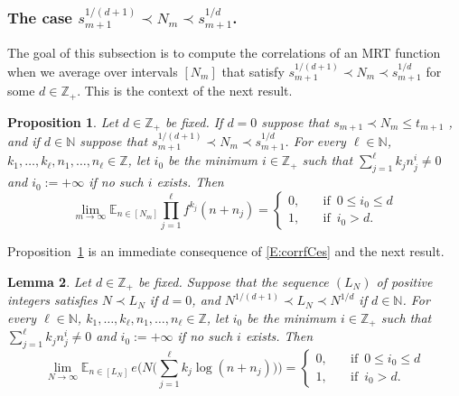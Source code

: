 \documentclass[11pt]{amsart}
\newtheorem{lemma}{Lemma}[section]
\newtheorem{proposition}[lemma]{Proposition}
\theoremstyle{definition}
\newcommand{\E}{{\mathbb E}}
\newcommand{\N}{{\mathbb N}}
\newcommand{\Z}{{\mathbb Z}}
\begin{document}
 	
 	
 		\subsubsection{The case  $s_{m+1}^{1/(d+1)}\prec N_m\prec s_{m+1}^{1/d}$.}
 		The goal of this subsection is to compute the correlations of an MRT function when
we average over intervals     $[N_m]$ that satisfy $s_{m+1}^{1/(d+1)}\prec N_m\prec s_{m+1}^{1/d}$ for some $d\in \Z_+$. This is the context of the next result.
	\begin{proposition}\label{P:corrlog2}
	Let  $d\in \Z_+$ be fixed. If $d=0$ suppose that
	$s_{m+1}\prec N_m\leq t_{m+1}$ ,  and  if $d\in \N$ suppose that $s_{m+1}^{1/(d+1)}\prec N_m\prec s_{m+1}^{1/d}$.
	For every $\ell\in\N$, $k_1,\ldots, k_\ell, n_1,\ldots, n_\ell \in \Z$,
	let  $i_0$ be the minimum $i\in \Z_+$
	such that $\sum_{j=1}^\ell k_j n_j^i\neq  0$ and $i_0:=+\infty$ if no such   $i$ exists.
	Then 	
	$$
		\lim_{m\to \infty}	\E_{n\in[N_m]}\prod_{j=1}^\ell f^{k_j}(n+n_j)=
	\begin{cases}
		0, & \quad \text{if }\,  0\leq i_0\leq d\\
		1, & \quad \text{if } \, i_0>d.
	\end{cases}
	$$
\end{proposition}
	Proposition~\ref{P:corrlog2} is an immediate consequence of \eqref{E:corrfCes} and the next result.
 	\begin{lemma}\label{L:corrlog2}
 		 Let  $d\in \Z_+$ be fixed. Suppose that the sequence $(L_N)$ of positive integers
 		 satisfies
 		 $N\prec L_N$ if $d=0$, and  $N^{1/(d+1)}\prec L_N\prec N^{1/d}$ if $d\in \N$.
 For every $\ell\in\N$, $k_1,\ldots, k_\ell, n_1,\ldots, n_\ell \in \Z$,
 let  $i_0$ be the minimum $i\in \Z_+$
 such that $\sum_{j=1}^\ell k_j n_j^i\neq  0$ and $i_0:=+\infty$ if no such   $i$ exists.
 Then 	
 $$
\lim_{N\to \infty} 	\E_{n\in[L_N]}\, e\big(N\big(\sum_{j=1}^\ell k_j \log(n+n_j)\big)\big)=
 \begin{cases}
 	0, & \quad \text{if }\,  0\leq i_0\leq d\\
 	1, & \quad \text{if } \, i_0> d.
 \end{cases}
 $$
 \end{lemma}
\end{document}

